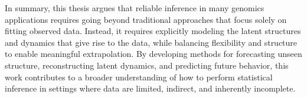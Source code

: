 In summary, this thesis argues that reliable inference in many genomics applications requires going beyond traditional approaches that focus solely on fitting observed data. Instead, it requires explicitly modeling the latent structures and dynamics that give rise to the data, while balancing flexibility and structure to enable meaningful extrapolation. By developing methods for forecasting unseen structure, reconstructing latent dynamics, and predicting future behavior, this work contributes to a broader understanding of how to perform statistical inference in settings where data are limited, indirect, and inherently incomplete.